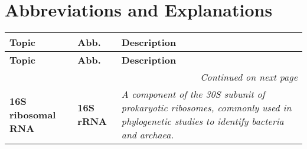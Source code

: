 \setlength{\headheight}{12.71342pt}
\addtolength{\topmargin}{-0.71342pt}

\chapter{Abbreviations and Explanations}

\begin{longtable}{| p{5cm} | p{2cm} | p{7.5cm} |}
    \hline
    \textbf{Topic} & \textbf{Abb.} & \textbf{Description} \\ 
    \hline
    \endfirsthead
    
    \hline
    \textbf{Topic} & \textbf{Abb.} & \textbf{Description} \\ 
    \hline
    \endhead
    
    \hline \multicolumn{3}{r}{\textit{Continued on next page}} \\ 
    \endfoot
    
    \hline
    \endlastfoot
    
    \textbf{16S ribosomal RNA} & \textbf{16S rRNA} & \textit{A component of the 30S subunit of prokaryotic ribosomes, commonly used in phylogenetic studies to identify bacteria and archaea.} \\
    \hline
    \end{longtable}

